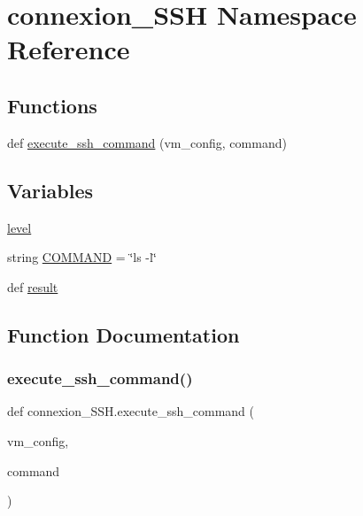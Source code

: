 \hypertarget{namespaceconnexion__SSH}{}\section{connexion\+\_\+\+S\+SH Namespace Reference}
\label{namespaceconnexion__SSH}
\subsection*{Functions}
\begin{DoxyCompactItemize}
\item 
def \hyperlink{namespaceconnexion__SSH_a301597cff046e519a69daa584f1d9166}{execute\+\_\+ssh\+\_\+command} (vm\+\_\+config, command)
\end{DoxyCompactItemize}
\subsection*{Variables}
\begin{DoxyCompactItemize}
\item 
\hyperlink{namespaceconnexion__SSH_ab87d32049db052980aa5060e990b4ce9}{level}
\item 
string \hyperlink{namespaceconnexion__SSH_a0ca1d2768931747fc32a06533a7ed80b}{C\+O\+M\+M\+A\+ND} = \char`\"{}ls -\/l\char`\"{}
\item 
def \hyperlink{namespaceconnexion__SSH_ab06475dbad7f16b89c9114749bc95254}{result}
\end{DoxyCompactItemize}


\subsection{Function Documentation}
\mbox{\label{namespaceconnexion__SSH_a301597cff046e519a69daa584f1d9166}} 
\subsubsection{\texorpdfstring{execute\+\_\+ssh\+\_\+command()}{execute\_ssh\_command()}}
{\footnotesize\ttfamily def connexion\+\_\+\+S\+S\+H.\+execute\+\_\+ssh\+\_\+command (\begin{DoxyParamCaption}\item[{}]{vm\+\_\+config,  }\item[{}]{command }\end{DoxyParamCaption})}

